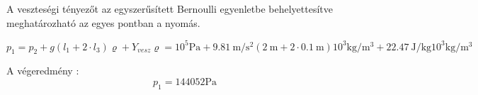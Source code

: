 \noindent A veszteségi tényezőt az egyszerűsített Bernoulli egyenletbe behelyettesítve meghatározható az egyes pontban a nyomás.

\begin{equation}
{p_{1}} = {p_{2}} + g (l_{1}+2 \cdot l_{3}) {\varrho} + Y_{vesz} {\varrho} = {10^5}\si{\pascal} + \SI {9,81}{\meter\per\second\squared} (\SI{2}{\m} + 2 \cdot \SI{0,1}{\m}) 10^3 \si{\kg\per\meter\cubed} + \SI {22,47}{\joule\per\kilogram} 10^3 \si{\kg\per\meter\cubed}
\end{equation}

\noindent A végeredmény :
\begin{equation}
{p_{1}} = {144052}\si{\pascal}
\end{equation}